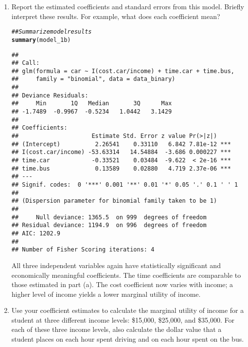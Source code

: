 \documentclass[11pt,letterpaper]{article}\usepackage[]{graphicx}\usepackage[]{xcolor}
\makeatletter
\newcommand{\hlcom}[1]{\textcolor[rgb]{0.678,0.584,0.686}{\textit{#1}}}%
\newcommand{\hlstd}[1]{\textcolor[rgb]{0.345,0.345,0.345}{#1}}%
\newcommand{\hlkwd}[1]{\textcolor[rgb]{0.737,0.353,0.396}{\textbf{#1}}}%
\newenvironment{kframe}{%
 \def\at@end@of@kframe{}%
 \ifinner\ifhmode%
  \def\at@end@of@kframe{\end{minipage}}%
  \begin{minipage}{\columnwidth}%
 \fi\fi%
 \def\FrameCommand##1{\hskip\@totalleftmargin \hskip-\fboxsep
 \colorbox{shadecolor}{##1}\hskip-\fboxsep
     \hskip-\linewidth \hskip-\@totalleftmargin \hskip\columnwidth}%
 \MakeFramed {\advance\hsize-\width
   \@totalleftmargin\z@ \linewidth\hsize
   \@setminipage}}%
 {\par\unskip\endMakeFramed%
 \at@end@of@kframe}
\newenvironment{knitrout}{}{} %
\makeatother
\begin{document}
\begin{enumerate}[label=\alph*., leftmargin=*]
	\begin{enumerate}[label=\roman*.]
		\item Report the estimated coefficients and standard errors from this model. Briefly interpret these results. For example, what does each coefficient mean?

\begin{knitrout}
\color{fgcolor}\begin{kframe}
\begin{alltt}
\hlcom{## Summarize model results}
\hlkwd{summary}\hlstd{(model_1b)}
\end{alltt}
\begin{verbatim}
## 
## Call:
## glm(formula = car ~ I(cost.car/income) + time.car + time.bus, 
##     family = "binomial", data = data_binary)
## 
## Deviance Residuals: 
##     Min       1Q   Median       3Q      Max  
## -1.7489  -0.9967  -0.5234   1.0442   3.1429  
## 
## Coefficients:
##                     Estimate Std. Error z value Pr(>|z|)    
## (Intercept)          2.26541    0.33110   6.842 7.81e-12 ***
## I(cost.car/income) -53.63314   14.54884  -3.686 0.000227 ***
## time.car            -0.33521    0.03484  -9.622  < 2e-16 ***
## time.bus             0.13589    0.02880   4.719 2.37e-06 ***
## ---
## Signif. codes:  0 '***' 0.001 '**' 0.01 '*' 0.05 '.' 0.1 ' ' 1
## 
## (Dispersion parameter for binomial family taken to be 1)
## 
##     Null deviance: 1365.5  on 999  degrees of freedom
## Residual deviance: 1194.9  on 996  degrees of freedom
## AIC: 1202.9
## 
## Number of Fisher Scoring iterations: 4
\end{verbatim}
\end{kframe}
\end{knitrout}

		All three independent variables again have statistically significant and economically meaningful coefficients. The time coefficients are comparable to those estimated in part (a). The cost coefficient now varies with income; a higher level of income yields a lower marginal utility of income. 

		\item Use your coefficient estimates to calculate the marginal utility of income for a student at three different income levels: \$15,000, \$25,000, and \$35,000. For each of these three income levels, also calculate the dollar value that a student places on each hour spent driving and on each hour spent on the bus.


\end{enumerate}
\end{enumerate}
\end{document}

